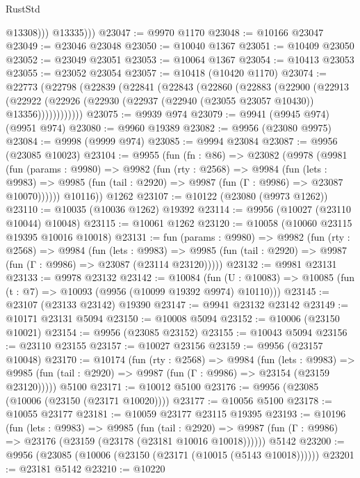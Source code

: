\begin{lexlean}{RustStd}
\begin{coremodule}
                @13308)))
          @13335)))
@23047 := @9970 @1170
@23048 := @10166 @23047
@23049 := @23046 @23048
@23050 := @10040 @1367
@23051 := @10409 @23050
@23052 := @23049 @23051
@23053 := @10064 @1367
@23054 := @10413 @23053
@23055 := @23052 @23054
@23057 := @10418 (@10420 @1170)
@23074 := @22773
    (@22798
      (@22839
        (@22841
          (@22843
            (@22860
              (@22883
                (@22900
                  (@22913
                    (@22922
                      (@22926 (@22930 (@22937 (@22940 (@23055 @23057 @10430)) @13356))))))))))))
@23075 := @9939 @974
@23079 := @9941 (@9945 @974) (@9951 @974)
@23080 := @9960 @19389
@23082 := @9956 (@23080 @9975)
@23084 := @9998 (@9999 @974)
@23085 := @9994 @23084
@23087 := @9956 (@23085 @10023)
@23104 := @9955
    (fun (fn : @86) =>
    @23082
      (@9978
        (@9981
          (fun (params : @9980) =>
          @9982
            (fun (rty : @2568) =>
            @9984
              (fun (lets : @9983) =>
              @9985 (fun (tail : @2920) => @9987 (fun (Γ : @9986) => @23087 @10070))))))
        @10116))
    @1262
@23107 := @10122 (@23080 (@9973 @1262))
@23110 := @10035 (@10036 @1262) @19392
@23114 := @9956 (@10027 (@23110 @10044) @10048)
@23115 := @10061 @1262
@23120 := @10058 (@10060 @23115 @19395 @10016 @10018)
@23131 := fun (params : @9980) =>
  @9982
    (fun (rty : @2568) =>
    @9984
      (fun (lets : @9983) =>
      @9985 (fun (tail : @2920) => @9987 (fun (Γ : @9986) => @23087 (@23114 @23120)))))
@23132 := @9981 @23131
@23133 := @9978 @23132
@23142 := @10084
    (fun (U : @10083) => @10085 (fun (t : @7) => @10093 (@9956 (@10099 @19392 @9974) @10110)))
@23145 := @23107 (@23133 @23142) @19390
@23147 := @9941 @23132 @23142
@23149 := @10171 @23131 @5094
@23150 := @10008 @5094
@23152 := @10006 (@23150 @10021)
@23154 := @9956 (@23085 @23152)
@23155 := @10043 @5094
@23156 := @23110 @23155
@23157 := @10027 @23156
@23159 := @9956 (@23157 @10048)
@23170 := @10174
    (fun (rty : @2568) =>
    @9984
      (fun (lets : @9983) =>
      @9985 (fun (tail : @2920) => @9987 (fun (Γ : @9986) => @23154 (@23159 @23120)))))
    @5100
@23171 := @10012 @5100
@23176 := @9956 (@23085 (@10006 (@23150 (@23171 @10020))))
@23177 := @10056 @5100
@23178 := @10055 @23177
@23181 := @10059 @23177 @23115 @19395
@23193 := @10196
    (fun (lets : @9983) =>
    @9985
      (fun (tail : @2920) =>
      @9987 (fun (Γ : @9986) => @23176 (@23159 (@23178 (@23181 @10016 @10018))))))
    @5142
@23200 := @9956 (@23085 (@10006 (@23150 (@23171 (@10015 (@5143 @10018))))))
@23201 := @23181 @5142
@23210 := @10220

\end{coremodule}
\end{lexlean}

